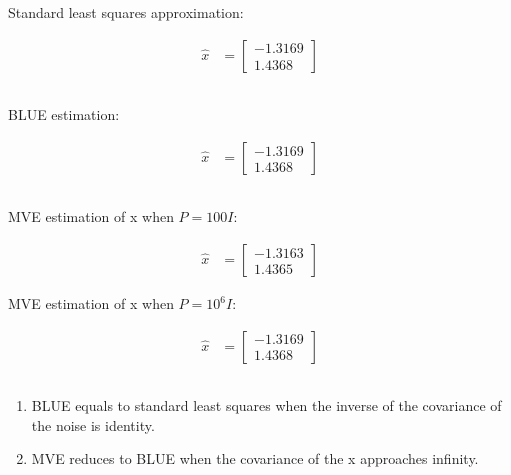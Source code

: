 \documentclass{article}
\theoremstyle{definition} %
\begin{document}
\subsection{}
Standard least squares approximation:

\begin{align*}
    \hat x &= 
    \begin{bmatrix}
        -1.3169\\
        1.4368
    \end{bmatrix}
\end{align*}

\subsection{}
BLUE estimation:

\begin{align*}
    \hat x &= 
    \begin{bmatrix}
        -1.3169\\
        1.4368
    \end{bmatrix}
\end{align*}

\subsection{}
MVE estimation of x when $P=100I$:

\begin{align*}
    \hat x &= 
    \begin{bmatrix}
        -1.3163\\
        1.4365
    \end{bmatrix}
\end{align*}

MVE estimation of x when $P=10^6I$:

\begin{align*}
    \hat x &= 
    \begin{bmatrix}
        -1.3169\\
        1.4368
    \end{bmatrix}
\end{align*}

\subsection{}
\begin{enumerate}
    \item 
    BLUE equals to standard least squares when the inverse of the covariance of the noise is identity.
    \item
    MVE reduces to BLUE when the covariance of the x approaches infinity.
\end{enumerate}
\end{document}
